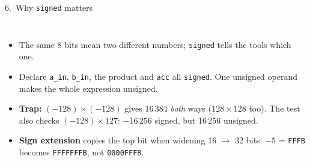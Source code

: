 \documentclass[aspectratio=169,11pt]{beamer}
\newcommand{\sig}[1]{\texttt{#1}}
\begin{document}
\begin{frame}{6.\ Why \sig{signed} matters}
  \begin{columns}[T]
    \small
    \begin{itemize}
      \item The same 8 bits mean two different numbers; \sig{signed} tells the tools which one.
      \item Declare \sig{a\_in}, \sig{b\_in}, the product and \sig{acc} all \sig{signed}. One
            unsigned operand makes the whole expression unsigned.
      \item \textbf{Trap:} $(-128)\times(-128)$ gives 16\,384 \emph{both} ways ($128 \times 128$ too).
            The test also checks $(-128)\times 127$: $-16\,256$ signed, but $16\,256$ unsigned.
      \item \textbf{Sign extension} copies the top bit when widening 16 $\to$ 32 bits:
            $-5$ = \sig{FFFB} becomes \sig{FFFFFFFB}, not \sig{0000FFFB}.
    \end{itemize}
  \end{columns}
\end{frame}
\end{document}
